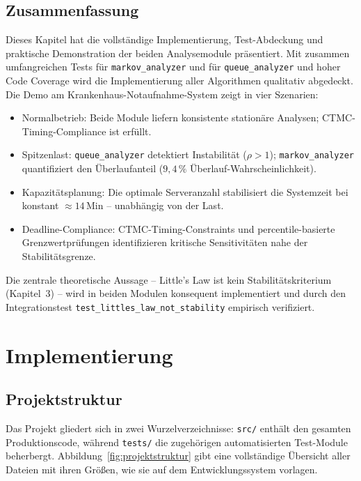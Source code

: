 ﻿\documentclass[a4paper,12pt]{scrreprt}
\theoremstyle{definition}
\begin{document}
\subsection{Zusammenfassung}

Dieses Kapitel hat die vollständige Implementierung, Test-Abdeckung und
praktische Demonstration der beiden Analysemodule präsentiert.
Mit zusammen umfangreichen Tests für \texttt{markov\_analyzer} und für
\texttt{queue\_analyzer} und hoher Code Coverage wird die
Implementierung aller Algorithmen qualitativ abgedeckt. Die Demo am
Krankenhaus-Notaufnahme-System zeigt in vier Szenarien:

\begin{itemize}
	\item[-] Normalbetrieb: Beide Module liefern konsistente stationäre
	Analysen; CTMC-Timing-Compliance ist erfüllt.
	\item[-] Spitzenlast: \texttt{queue\_analyzer} detektiert Instabilität
	($\rho > 1$); \texttt{markov\_analyzer} quantifiziert den Überlaufanteil
	($9{,}4\,\%$ Überlauf-Wahrscheinlichkeit).
	\item[-] Kapazitätsplanung: Die optimale Serveranzahl stabilisiert
	die Systemzeit bei konstant $\approx 14$\,Min -- unabhängig von der Last.
	\item[-] Deadline-Compliance: CTMC-Timing-Constraints und percentile-basierte
	Grenzwertprüfungen identifizieren kritische Sensitivitäten nahe der
	Stabilitätsgrenze.
\end{itemize}

Die zentrale theoretische Aussage -- Little's Law ist kein Stabilitätskriterium
(Kapitel~3) -- wird in beiden Modulen konsequent implementiert und durch
den Integrationstest \texttt{test\_littles\_law\_not\_stability} empirisch
verifiziert.


\section{Implementierung}

\subsection{Projektstruktur}
\label{subsec:projektstruktur}

Das Projekt gliedert sich in zwei Wurzelverzeichnisse:
\texttt{src/} enthält den gesamten Produktionscode, während
\texttt{tests/} die zugehörigen automatisierten Test-Module
beherbergt. Abbildung~\ref{fig:projektstruktur} gibt eine
vollständige Übersicht aller Dateien mit ihren Größen, wie
sie auf dem Entwicklungssystem vorlagen.
\end{document}
